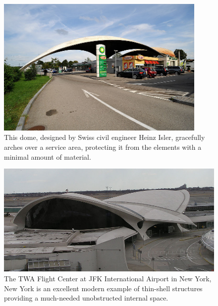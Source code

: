 \documentclass{thesis}
\begin{document}
\begin{figure}
\centering
\includegraphics[width=4in]{images/isler_dome_1.jpg}
\caption[A thin-shell dome over a service area in Switzerland]{This dome, designed by Swiss civil engineer Heinz Isler, gracefully arches over
a service area, protecting it from the elements with a minimal amount of material.\footnotemark}
\label{fig:isler_service}
\end{figure}

\begin{figure}
\centering
\includegraphics[width=5in]{images/twa_flight_center.jpg}
\caption[The TWA Flight Center]{The TWA Flight Center at JFK International Airport in New York, New York is an excellent modern example of
thin-shell structures providing a much-needed unobstructed internal space.\footnotemark}
\label{fig:twa_flight}
\end{figure}
\end{document}
